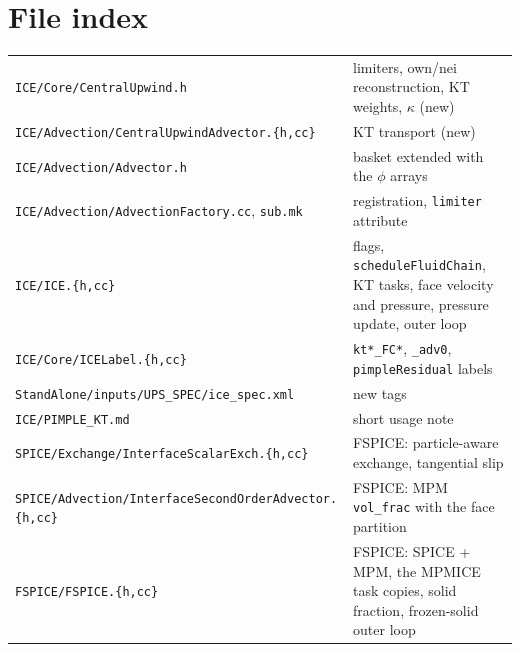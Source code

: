 \documentclass[11pt]{article}
\newcommand{\code}[1]{\texttt{\small #1}}
\newcommand{\file}[1]{\texttt{\small\color{Moss}#1}}
\begin{document}
\section*{File index}
\begin{center}
\small
\begin{tabularx}{\linewidth}{@{}l X@{}}
\toprule
\file{ICE/Core/CentralUpwind.h} & limiters, own/nei reconstruction, KT weights, $\kappa$ (new) \\
\file{ICE/Advection/CentralUpwindAdvector.\{h,cc\}} & KT transport (new) \\
\file{ICE/Advection/Advector.h} & basket extended with the $\phi$ arrays \\
\file{ICE/Advection/AdvectionFactory.cc}, \file{sub.mk} & registration, \code{limiter} attribute \\
\file{ICE/ICE.\{h,cc\}} & flags, \code{scheduleFluidChain}, KT tasks, face velocity and pressure, pressure update, outer loop \\
\file{ICE/Core/ICELabel.\{h,cc\}} & \code{kt*\_FC*}, \code{*\_adv0}, \code{pimpleResidual} labels \\
\file{StandAlone/inputs/UPS\_SPEC/ice\_spec.xml} & new tags \\
\file{ICE/PIMPLE\_KT.md} & short usage note \\
\file{SPICE/Exchange/InterfaceScalarExch.\{h,cc\}} & FSPICE: particle-aware exchange, tangential slip \\
\file{SPICE/Advection/InterfaceSecondOrderAdvector.\{h,cc\}} & FSPICE: MPM \code{vol\_frac} with the face partition \\
\file{FSPICE/FSPICE.\{h,cc\}} & FSPICE: SPICE + MPM, the MPMICE task copies, solid fraction, frozen-solid outer loop \\
\bottomrule
\end{tabularx}
\end{center}
\end{document}
